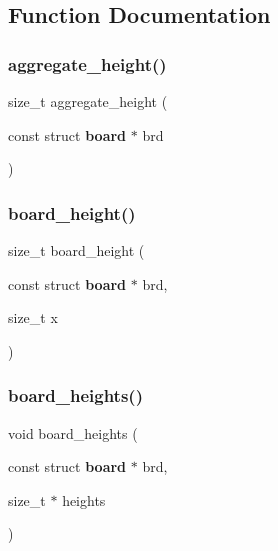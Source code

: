 \subsection{Function Documentation}
\mbox{\label{tools_8h_af641e6b38f455ac3f9f1a5f49d3bc787}} 
\subsubsection{aggregate\+\_\+height()}
{\footnotesize\ttfamily size\+\_\+t aggregate\+\_\+height (\begin{DoxyParamCaption}\item[{const struct \textbf{ board} $\ast$}]{brd }\end{DoxyParamCaption})\hspace{0.3cm}{\ttfamily [inline]}}

\mbox{\label{tools_8h_a4ca7e6505b351ba190d31948268ff2cb}} 
\subsubsection{board\+\_\+height()}
{\footnotesize\ttfamily size\+\_\+t board\+\_\+height (\begin{DoxyParamCaption}\item[{const struct \textbf{ board} $\ast$}]{brd,  }\item[{size\+\_\+t}]{x }\end{DoxyParamCaption})\hspace{0.3cm}{\ttfamily [inline]}}

\mbox{\label{tools_8h_ab2be749cc3ff926d84d4d19b40db0c5f}} 
\subsubsection{board\+\_\+heights()}
{\footnotesize\ttfamily void board\+\_\+heights (\begin{DoxyParamCaption}\item[{const struct \textbf{ board} $\ast$}]{brd,  }\item[{size\+\_\+t $\ast$}]{heights }\end{DoxyParamCaption})\hspace{0.3cm}{\ttfamily [inline]}}


